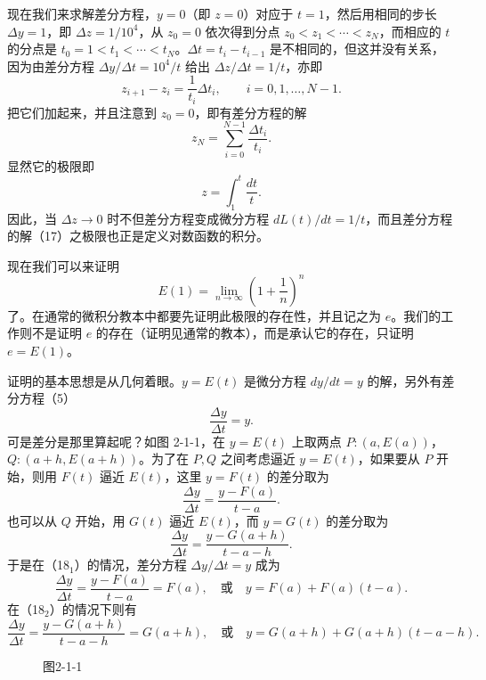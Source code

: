 现在我们来求解差分方程，$y=0$（即 $z=0$）对应于 $t=1$，然后用相同的步长 $\Delta y=1$，即 $\Delta z=1/10^4$，从 $z_0=0$ 依次得到分点 $z_0<z_1<\cdots<z_N$，而相应的 $t$ 的分点是 $t_0=1<t_1<\cdots<t_N$。$\Delta t=t_i-t_{i-1}$ 是不相同的，但这并没有关系，因为由差分方程 $\Delta y/\Delta t=10^4/t$ 给出 $\Delta z/\Delta t=1/t$，亦即
\[
z_{i+1}-z_i=\frac1{t_i}\Delta t_i,
\qquad i=0,1,\ldots,N-1.
\]
把它们加起来，并且注意到 $z_0=0$，即有差分方程的解
\[
z_N=\sum_{i=0}^{N-1}\frac{\Delta t_i}{t_i}. \tag{17}
\]
显然它的极限即
\[
z=\int_1^t\frac{dt}{t}.
\]
因此，当 $\Delta z\to0$ 时不但差分方程变成微分方程 $dL(t)/dt=1/t$，而且差分方程的解（17）之极限也正是定义对数函数的积分。

现在我们可以来证明
\[
E(1)=\lim_{n\to\infty}\left(1+\frac1n\right)^n
\]
了。在通常的微积分教本中都要先证明此极限的存在性，并且记之为 $e$。我们的工作则不是证明 $e$ 的存在（证明见通常的教本），而是承认它的存在，只证明 $e=E(1)$。

证明的基本思想是从几何着眼。$y=E(t)$ 是微分方程 $dy/dt=y$ 的解，另外有差分方程（5）
\[
\frac{\Delta y}{\Delta t}=y. \tag{18}
\]
可是差分是那里算起呢？如图 2-1-1，在 $y=E(t)$ 上取两点 $P:(a,E(a))$，$Q:(a+h,E(a+h))$。为了在 $P,Q$ 之间考虑逼近 $y=E(t)$，如果要从 $P$ 开始，则用 $F(t)$ 逼近 $E(t)$，这里 $y=F(t)$ 的差分取为
\[
\frac{\Delta y}{\Delta t}=\frac{y-F(a)}{t-a}. \tag{18$_1$}
\]
也可以从 $Q$ 开始，用 $G(t)$ 逼近 $E(t)$，而 $y=G(t)$ 的差分取为
\[
\frac{\Delta y}{\Delta t}=\frac{y-G(a+h)}{t-a-h}. \tag{18$_2$}
\]
于是在（18$_1$）的情况，差分方程 $\Delta y/\Delta t=y$ 成为
\[
\frac{\Delta y}{\Delta t}=\frac{y-F(a)}{t-a}=F(a),
\quad\text{或}\quad
 y=F(a)+F(a)(t-a). \tag{19$_1$}
\]
在（18$_2$）的情况下则有
\[
\frac{\Delta y}{\Delta t}=\frac{y-G(a+h)}{t-a-h}=G(a+h),
\quad\text{或}\quad
 y=G(a+h)+G(a+h)(t-a-h). \tag{19$_2$}
\]

\begin{figure}[htbp]
\centering
{}
\caption*{图2-1-1}
\end{figure}

